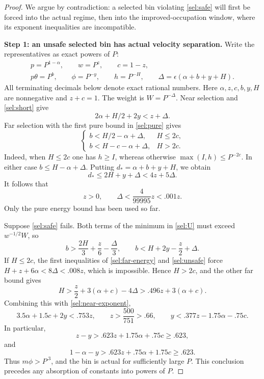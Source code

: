 \begin{proof}
We argue by contradiction: a selected bin violating \eqref{sel:safe}
will first be forced into the actual regime, then into the
improved-occupation window, where its exponent inequalities are
incompatible.

\noindent\textbf{Step 1: an unsafe selected bin has actual velocity separation.}
Write the representatives as exact powers of $P$:
\begin{equation}\label{sel:powers}
 \begin{gathered}
 p=P^{1-\alpha},\qquad w=P^z,\qquad c=1-z,\\
 p\theta=P^b,\qquad \phi=P^{-y},\qquad h=P^{-H},\qquad
 \Delta=\epsilon(\alpha+b+y+H).
 \end{gathered}
\end{equation}
All terminating decimals below denote exact rational numbers.
Here $\alpha,z,c,b,y,H$ are nonnegative and $z+c=1$. The weight is
$W=P^{-\Delta}$. Near selection and \eqref{sel:short} give
\begin{equation}\label{sel:near-exponent}
 2\alpha+H/2+2y<z+\Delta.
\end{equation}
Far selection with the first pure bound in \eqref{sel:pure} gives
\begin{equation}\label{sel:far-energy}
 \begin{cases}
 b<H/2-\alpha+\Delta,&H\le2c,\\
 b<H-c-\alpha+\Delta,&H>2c.
 \end{cases}
\end{equation}
Indeed, when $H\le2c$ one has $h\ge I$, whereas otherwise
$\max(I,h)\le P^{-2c}$. In either case $b\le H-\alpha+\Delta$.
Putting $d_*=\alpha+b+y+H$, we obtain
\[
 d_*\le2H+y+\Delta<4z+5\Delta.
\]
It follows that
\begin{equation}\label{sel:delta-small}
 z>0,\qquad
 \Delta<\frac4{99995}z<.001z.
\end{equation}
Only the pure energy bound has been used so far.

Suppose \eqref{sel:safe} fails. Both terms of the minimum in
\eqref{sel:U} must exceed $w^{-1/2}W$, so
\begin{equation}\label{sel:unsafe}
 b>\frac{2H}3+\frac z6-\frac\Delta3,
 \qquad b<H+2y-\frac z2+\Delta.
\end{equation}
If $H\le2c$, the first inequalities of \eqref{sel:far-energy} and
\eqref{sel:unsafe} force $H+z+6\alpha<8\Delta<.008z$, which is
impossible. Hence $H>2c$, and the other far bound gives
\begin{equation}\label{sel:H-lower}
 H>\frac z2+3(\alpha+c)-4\Delta
 >.496z+3(\alpha+c).
\end{equation}
Combining this with \eqref{sel:near-exponent},
\begin{equation}\label{sel:actual-margin}
 3.5\alpha+1.5c+2y<.753z,\qquad
 z>\frac{500}{751}>.66,\qquad
 y<.377z-1.75\alpha-.75c.
\end{equation}
In particular,
\[
 z-y>.623z+1.75\alpha+.75c\ge.623,
\]
and
\[
 1-\alpha-y>.623z+.75\alpha+1.75c\ge.623.
\]
Thus $m\phi>P^{.3}$, and the bin is actual for sufficiently large $P$.
This conclusion precedes any absorption of constants into powers of $P$.


\end{proof}
